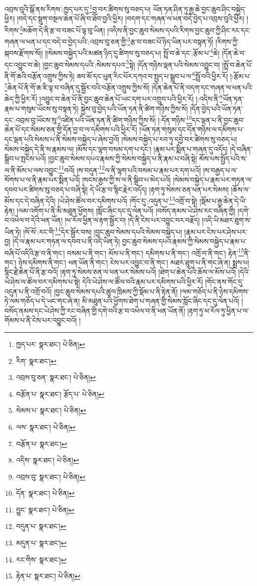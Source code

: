 འབྲས་བུའི་སྒོ་ནས་རིགས་:ཁྱད་པར་དུ་\footnote{ཁྱད་པར་  སྣར་ཐང་།  པེ་ཅིན། }བྱ་བར་ཚིགས་སུ་བཅད་པ། ཡོན་ཏན་ཤིན་ཏུ་རྒྱ་ཆེ་བྱང་ཆུབ་ཤིང་བསྐྱེད་ཕྱིར། །བདེ་དང་སྡུག་བསྔལ་ཆེན་པོ་ཞི་བ་ཐོབ་བྱའི་ཕྱིར། །བདག་དང་གཞན་ལ་ཕན་བདེ་བྱེད་པ་འབྲས་བུའི་ཕྱིར། །རིགས་\footnote{རིག་  སྣར་ཐང་། }མཆོག་དེ་ནི་རྩ་བ་བཟང་པོ་ལྟ་བུ་ཡིན། །འདིས་ནི་བྱང་ཆུབ་སེམས་དཔའི་རིགས་བྱང་ཆུབ་ཀྱི་ཤིང་རང་དང་གཞན་ལ་ཕན་པ་དང་བདེ་བ་བྱེད་པའི་:འབྲས་བུ་ཅན་གྱི་\footnote{འབྲས་བུ་ཅན་  སྣར་ཐང་།  པེ་ཅིན། }རྩ་བ་བཟང་པོ་ཉིད་ཡིན་པར་བསྟན་ཏོ། །རིགས་ཀྱི་སྐབས་རྫོགས་སོ།། །།སེམས་བསྐྱེད་པའི་མཚན་ཉིད་དུ་ཚིགས་སུ་བཅད་པ། སྤྲོ་བ་ཆེ་དང་:རྩོམ་པ་\footnote{བརྩོན་པ་  སྣར་ཐང་། རྩོད་པ་  པེ་ཅིན། }ཆེ། །དོན་ཆེ་བ་དང་འབྱུང་བ་ཆེ། །བྱང་ཆུབ་སེམས་དཔའི་:སེམས་དཔའ་\footnote{སེམས་པ་  སྣར་ཐང་།  པེ་ཅིན། }སྟེ། །དོན་གཉིས་ལྡན་པའི་སེམས་འབྱུང་བ། །སྤྲོ་བ་ཆེན་པོ་ནི་གོ་ཆའི་བརྩོན་འགྲུས་ཀྱིས་ཏེ། ཟབ་མོ་དང་ཡུན་རིང་པོར་དཀའ་བ་སྤྱད་པ་སྒྲུབ་པ་ལ་\footnote{ལས་  སྣར་ཐང་།  པེ་ཅིན། }སྤྲོ་བའི་ཕྱིར་རོ། །:རྩོམ་པ་\footnote{བརྩོན་པ་  སྣར་ཐང་། }ཆེན་པོ་ནི་གོ་ཆ་ཇི་ལྟ་བ་བཞིན་དུ་སྦྱོར་བའི་བརྩོན་འགྲུས་ཀྱིས་སོ། །དོན་ཆེན་པོ་ནི་བདག་དང་གཞན་ལ་ཕན་པའི་ཆེད་ཀྱི་ཕྱིར་རོ། །འབྱུང་བ་ཆེན་པོ་ནི་བྱང་ཆུབ་ཆེན་པོ་ཡང་དག་པར་འགྲུབ་པའི་ཕྱིར་རོ། །:འདིས་ནི་\footnote{འདིས་  སྣར་ཐང་།  པེ་ཅིན། }ཡོན་ཏན་རྣམ་པ་གསུམ་ཡོངས་སུ་བསྟན་ཏེ། སྐྱེས་བུ་བྱེད་པའི་ཡོན་ཏན་ནི་ཚིག་གཉིས་ཀྱིས་སོ། །དོན་བྱེད་པའི་ཡོན་ཏན་དང་:འབྲས་བུ་ཡོངས་སུ་\footnote{འབྲས་བུ་  སྣར་ཐང་།  པེ་ཅིན། }འཛིན་པའི་ཡོན་ཏན་ནི་ཚིག་གཉིས་ཀྱིས་སོ། །:དོན་གཉིས་\footnote{དོན་  སྣར་ཐང་།  པེ་ཅིན། }དང་ལྡན་པ་ནི་བྱང་ཆུབ་ཆེན་པོ་དང་སེམས་ཅན་གྱི་དོན་བྱ་བ་ལ་དམིགས་པའི་ཕྱིར་རོ། །ཡོན་ཏན་གསུམ་དང་དོན་གཉིས་ལ་དམིགས་པ་དང་ལྡན་པའི་སེམས་པ་ནི་སེམས་བསྐྱེད་པ་ཞེས་བྱའོ། །སེམས་བསྐྱེད་པ་རབ་ཏུ་དབྱེ་བར་ཚིགས་སུ་བཅད་པ། སེམས་བསྐྱེད་དེ་ནི་ས་རྣམས་ལ། །མོས་དང་ལྷག་བསམ་དག་པ་དང་། །རྣམ་པར་སྨིན་པ་གཞན་དུ་འདོད། །དེ་བཞིན་སྒྲིབ་པ་སྤངས་པའོ། །བྱང་ཆུབ་སེམས་དཔའ་རྣམས་ཀྱི་སེམས་བསྐྱེད་པ་ནི་རྣམ་པ་བཞི་སྟེ། མོས་པས་སྤྱོད་པའི་ས་ལ་ནི་མོས་པ་ལས་འབྱུང་\footnote{བྱུང་  སྣར་ཐང་།  པེ་ཅིན། }བའོ། །ས་བདུན་\footnote{བདུན་པ་  སྣར་ཐང་། }ལ་ནི་ལྷག་པའི་བསམ་པ་རྣམ་པར་དག་པའོ། །ས་བརྒྱད་པ་ལ་སོགས་པ་ལ་ནི་རྣམ་པར་སྨིན་པའོ། །སངས་རྒྱས་ཀྱི་ས་ལ་ནི་སྒྲིབ་པ་མེད་པའོ། །སེམས་བསྐྱེད་པ་རྣམ་པར་གཏན་ལ་དབབ་པར་ཚིགས་སུ་བཅད་པ་བཞི་སྟེ། དེ་ཡི་རྩ་བ་སྙིང་རྗེར་འདོད། །རྟག་ཏུ་སེམས་ཅན་ཕན་པར་སེམས། །ཆོས་ལ་མོས་དང་དེ་བཞིན་དེའི། །ཡེ་ཤེས་ཚོལ་བར་དམིགས་པའོ། །གོང་དུ་:འདུན་པ་\footnote{མདུན་པ་  སྣར་ཐང་། }འགྲོ་བ་སྟེ། །སྡོམ་པ་རྒྱ་ཆེན་དེ་ཡི་རྟེན། །ལམ་འགོག་པ་ནི་མི་མཐུན་ཕྱོགས། །སློང་ཞིང་དང་དུ་ལེན་པའོ། །བསོད་ནམས་ཡེ་ཤེས་རང་བཞིན་གྱི། །དགེ་བ་འཕེལ་བ་དེའི་ཕན་ཡོན། །ཕ་རོལ་ཕྱིན་ལ་རྟག་སྦྱོར་བ། །དེ་ནི་ངེས་པར་འབྱུང་བར་བརྗོད། །འདི་ཡི་མཐར་ཐུག་ས་ཡིན་ཏེ། །སོ་སོ་:རང་གི་\footnote{རང་གིས་  སྣར་ཐང་། }དེར་སྦྱོར་བས། །བྱང་ཆུབ་སེམས་དཔའི་སེམས་བསྐྱེད་པ། །རྣམ་པར་ངེས་པར་ཤེས་པར་བྱ། །དེ་ལ་རྣམ་པར་གཏན་ལ་དབབ་པ་ནི་འདི་ཡིན་ཏེ། བྱང་ཆུབ་སེམས་དཔའ་རྣམས་ཀྱི་སེམས་བསྐྱེད་པ་རྣམ་པ་བཞི་པོ་འདིའི་རྩ་བ་ནི་གང་། བསམ་པ་ནི་གང་། མོས་པ་ནི་གང་། དམིགས་པ་ནི་གང་། འགྲོ་བ་ནི་གང་། རྟེན་\footnote{རྟེན་པ་  སྣར་ཐང་།  པེ་ཅིན། }ནི་གང་། ཉེས་དམིགས་ནི་གང་། ཕན་ཡོན་ནི་གང་། ངེས་པར་འབྱུང་བ་ནི་གང་། མཐར་ཐུག་པ་ནི་གང་ཞེ་ན། སྨྲས་པ། སྙིང་རྗེ་ཆེན་པོ་ནི་རྩ་བའོ། །རྟག་ཏུ་སེམས་ཅན་ལ་ཕན་པར་སེམས་པའོ། །ཐེག་པ་ཆེན་པོའི་ཆོས་ལ་མོས་པའོ། །དེའི་ཡེ་ཤེས་ལ་ཚོལ་བར་དམིགས་པ་སྟེ། དེའི་ཡེ་ཤེས་ལ་ཚོལ་བའི་རྣམ་པར་དམིགས་པའི་ཕྱིར་རོ། །གོང་ནས་གོང་དུ་འདུན་པ་ནི་འགྲོ་བའོ། །བྱང་ཆུབ་སེམས་དཔའི་ཚུལ་ཁྲིམས་ཀྱི་སྡོམ་པ་ནི་རྟེན་ནོ། །ལམ་གཅོད་པ་ནི་ཉེས་དམིགས་ཏེ་ལམ་གཅོད་པ་དེ་ཡང་གང་ཞེ་ན། མི་མཐུན་པའི་ཕྱོགས་ཐེག་པ་གཞན་གྱི་སེམས་སློང་ཞིང་དང་དུ་ལེན་པའོ། །བསོད་ནམས་དང་ཡེ་ཤེས་ཀྱི་རང་བཞིན་གྱི་དགེ་བའི་རྩ་བ་འཕེལ་བ་ནི་ཕན་ཡོན་ནོ། །རྟག་ཏུ་ཕ་རོལ་ཏུ་ཕྱིན་པ་ལ་གོམས་པ་ནི་ངེས་པར་འབྱུང་བའོ། །
